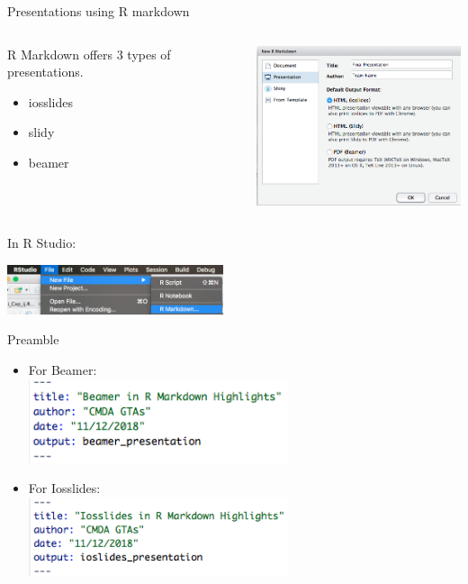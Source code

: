 \documentclass{beamer}
\begin{document}
% 

\begin{frame}{Presentations using R markdown}

\begin{columns}
\begin{column}{0.45\textwidth}
R Markdown offers 3 types of presentations.
\begin{itemize}
    \item iosslides
    \item slidy
    \item beamer
\end{itemize}
\end{column}

\begin{column}{0.55\textwidth}
\includegraphics[width=2.5in]{RMarkdown/2.png}
\end{column}
\end{columns}

In R Studio:\\
\vspace{6pt}

\includegraphics[width=2.5in]{RMarkdown/1.png}
\end{frame}

\begin{frame}{Preamble}
\begin{itemize}
\item For Beamer:\\
\includegraphics[width=3in]{RMarkdown/pre1.png}
\item For Iosslides:\\
\includegraphics[width=3in]{RMarkdown/pre2.png}
\end{itemize}
\end{frame}
\end{document}
